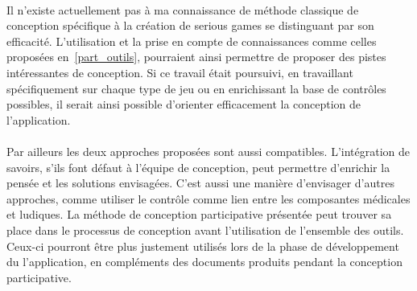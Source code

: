 \paragraph{} Il n'existe actuellement pas à ma connaissance de méthode classique de conception spécifique à la création de serious games se distinguant par son efficacité. L'utilisation et la prise en compte de connaissances comme celles proposées en~\ref{part_outils}, pourraient ainsi permettre de proposer des pistes intéressantes de conception. Si ce travail était poursuivi, en travaillant spécifiquement sur chaque type de jeu ou en enrichissant la base de contrôles possibles, il serait ainsi possible d'orienter efficacement la conception de l'application.

\paragraph{} Par ailleurs les deux approches proposées sont aussi compatibles. L'intégration de savoirs, s'ils font défaut à l'équipe de conception, peut permettre d'enrichir la pensée et les solutions envisagées. C'est aussi une manière d'envisager d'autres approches, comme utiliser le contrôle comme lien entre les composantes médicales et ludiques. La méthode de conception participative présentée peut trouver sa place dans le processus de conception avant l'utilisation de l'ensemble des outils. Ceux-ci pourront être plus justement utilisés lors de la phase de développement du l'application, en compléments des documents produits pendant la conception participative.
	

%	
